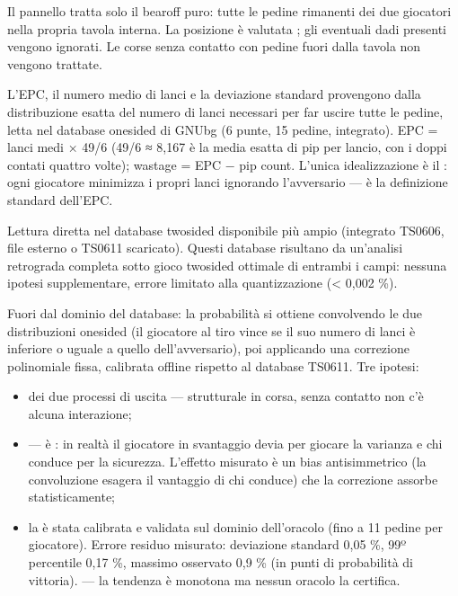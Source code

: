 \documentclass[letterpaper,10pt,italian]{sphinxmanual}
\begin{document}
\sphinxAtStartPar
{} Il pannello tratta solo il bearoff puro: tutte le pedine rimanenti dei due giocatori nella propria tavola interna. La posizione è valutata ; gli eventuali dadi presenti vengono ignorati. Le corse senza contatto con pedine fuori dalla tavola non vengono trattate.

\sphinxAtStartPar
{} L’EPC, il numero medio di lanci e la deviazione standard provengono dalla distribuzione esatta del numero di lanci necessari per far uscire tutte le pedine, letta nel database one\sphinxhyphen{}sided di GNUbg (6 punte, 15 pedine, integrato). EPC = lanci medi × 49/6 (49/6 ≈ 8,167 è la media esatta di pip per lancio, con i doppi contati quattro volte); wastage = EPC − pip count. L’unica idealizzazione è il : ogni giocatore minimizza i propri lanci ignorando l’avversario — è la definizione standard dell’EPC.

\sphinxAtStartPar
{} Lettura diretta nel database two\sphinxhyphen{}sided disponibile più ampio (integrato TS\sphinxhyphen{}06\sphinxhyphen{}06, file esterno o TS\sphinxhyphen{}06\sphinxhyphen{}11 scaricato). Questi database risultano da un’analisi retrograda completa sotto gioco two\sphinxhyphen{}sided ottimale di entrambi i campi: nessuna ipotesi supplementare, errore limitato alla quantizzazione (< 0,002 \%).

\sphinxAtStartPar
{} Fuori dal dominio del database: la probabilità si ottiene convolvendo le due distribuzioni one\sphinxhyphen{}sided (il giocatore al tiro vince se il suo numero di lanci è inferiore o uguale a quello dell’avversario), poi applicando una correzione polinomiale fissa, calibrata offline rispetto al database TS\sphinxhyphen{}06\sphinxhyphen{}11. Tre ipotesi:
\begin{itemize}
\item {} 
\sphinxAtStartPar
{} dei due processi di uscita — strutturale in corsa, senza contatto non c’è alcuna interazione;

\item {} 
\sphinxAtStartPar
{} — è : in realtà il giocatore in svantaggio devia per giocare la varianza e chi conduce per la sicurezza. L’effetto misurato è un bias antisimmetrico (la convoluzione esagera il vantaggio di chi conduce) che la correzione assorbe statisticamente;

\item {} 
\sphinxAtStartPar
la  è stata calibrata e validata sul dominio dell’oracolo (fino a 11 pedine per giocatore). Errore residuo misurato: deviazione standard 0,05 \%, 99º percentile 0,17 \%, massimo osservato 0,9 \% (in punti di probabilità di vittoria).  — la tendenza è monotona ma nessun oracolo la certifica.

\end{itemize}
\end{document}
